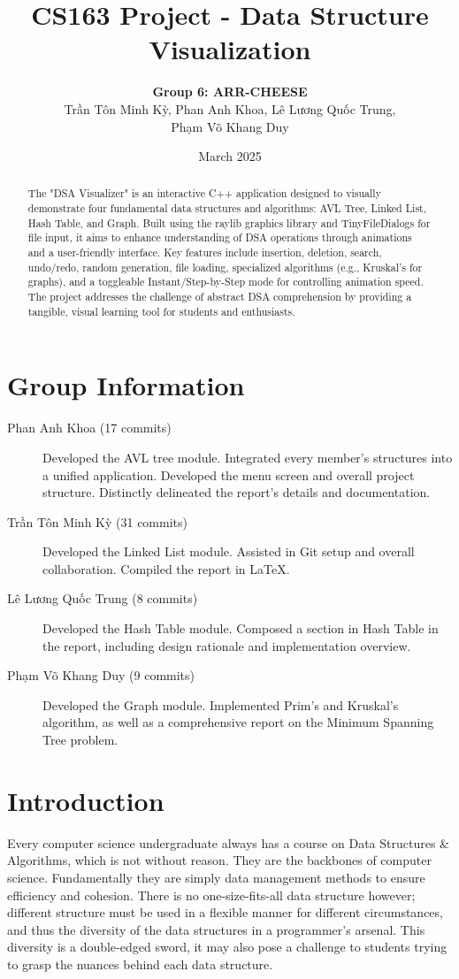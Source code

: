 \documentclass{article}
\title{CS163 Project - Data Structure Visualization}
\author{\textbf{Group 6: ARR-CHEESE}\\\foreignlanguage{vietnamese}{Trần Tôn Minh Kỳ, Phan Anh Khoa, Lê Lương Quốc Trung,}\\\foreignlanguage{vietnamese}{Phạm Võ Khang Duy}}
\date{March 2025}
\begin{document}
\maketitle

\begin{abstract}
    The "DSA Visualizer" is an interactive C++ application designed to visually demonstrate four fundamental data structures and algorithms: AVL Tree, Linked List, Hash Table, and Graph. Built using the raylib graphics library and TinyFileDialogs for file input, it aims to enhance understanding of DSA operations through animations and a user-friendly interface. Key features include insertion, deletion, search, undo/redo, random generation, file loading, specialized algorithms (e.g., Kruskal's for graphs), and a toggleable Instant/Step-by-Step mode for controlling animation speed. The project addresses the challenge of abstract DSA comprehension by providing a tangible, visual learning tool for students and enthusiasts.
\end{abstract}

\tableofcontents

\newpage
\section{Group Information}
\begin{description}
	\item[\foreignlanguage{vietnamese}{Phan Anh Khoa (17 commits)}] Developed the AVL tree module. Integrated every member's structures into a unified application. Developed the menu screen and overall project structure. Distinctly delineated the report's details and documentation.
	\item[\foreignlanguage{vietnamese}{Trần Tôn Minh Kỳ (31 commits)}] Developed the Linked List module. Assisted in Git setup and overall collaboration. Compiled the report in \LaTeX.
	\item[\foreignlanguage{vietnamese}{Lê Lương Quốc Trung (8 commits)}] Developed the Hash Table module. Composed a section in Hash Table in the report, including design rationale and implementation overview.
	\item[\foreignlanguage{vietnamese}{Phạm Võ Khang Duy (9 commits)}] Developed the Graph module. Implemented Prim's and Kruskal's algorithm, as well as a comprehensive report on the Minimum Spanning Tree problem.  
\end{description}

\section{Introduction}
Every computer science undergraduate always has a course on Data Structures \& Algorithms, which is not without reason. They are the backbones of computer science. Fundamentally they are simply data management methods to ensure efficiency and cohesion. There is no one-size-fits-all data structure however; different structure must be used in a flexible manner for different circumstances, and thus the diversity of the data structures in a programmer's arsenal. This diversity is a double-edged sword, it may also pose a challenge to students trying to grasp the nuances behind each data structure.
\end{document}
